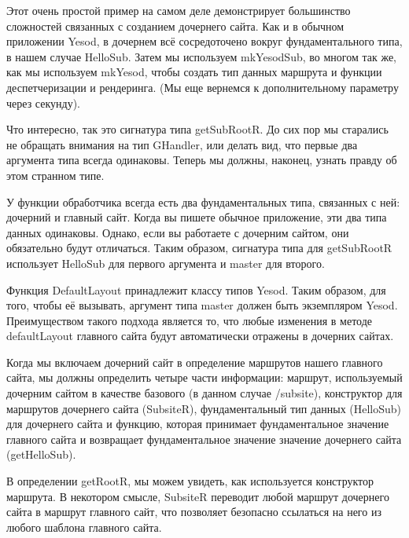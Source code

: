 Этот очень простой пример на самом деле демонстрирует большинство сложностей связанных с созданием дочернего сайта. Как и в обычном приложении Yesod, в дочернем всё сосредоточено вокруг фундаментального типа, в нашем случае HelloSub. Затем мы используем mkYesodSub, во многом так же, как мы используем mkYesod, чтобы создать тип данных маршрута и функции деспетчеризации и рендеринга. (Мы еще вернемся к дополнительному параметру через секунду).

Что интересно, так это сигнатура типа getSubRootR. До сих пор мы старались не обращать внимания на тип GHandler, или делать вид, что первые два аргумента типа всегда одинаковы. Теперь мы должны, наконец, узнать правду об этом странном типе.

У функции обработчика всегда есть два фундаментальных типа, связанных с ней: дочерний и главный сайт. Когда вы пишете обычное приложение, эти два типа данных одинаковы. Однако, если вы работаете с дочерним сайтом, они обязательно будут отличаться. Таким образом, сигнатура типа для getSubRootR использует HelloSub для первого аргумента и master для второго.

Функция DefaultLayout принадлежит классу типов Yesod. Таким образом, для того, чтобы её вызывать, аргумент типа master должен быть экземпляром Yesod. Преимуществом такого подхода является то, что любые изменения в методе defaultLayout главного сайта будут автоматически отражены в дочерних сайтах.

Когда мы включаем дочерний сайт в определение маршрутов нашего главного сайта, мы должны определить четыре части информации: маршрут, используемый дочерним сайтом в качестве базового (в данном случае /subsite), конструктор для маршрутов дочернего сайта (SubsiteR), фундаментальный тип данных (HelloSub) для дочернего сайта и функцию, которая принимает фундаментальное значение главного сайта и возвращает фундаментальное значение значение дочернего сайта (getHelloSub).

В определении getRootR, мы можем увидеть, как используется конструктор маршрута. В некотором смысле, SubsiteR переводит любой маршрут дочернего сайта в маршрут главного сайт, что позволяет безопасно ссылаться на него из любого шаблона главного сайта.
